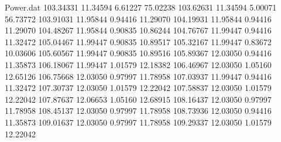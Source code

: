 \begin{filecontents}{Power.dat}
 103.34331   11.34594    6.61227   75.02238
 103.62631   11.34594    5.00071   56.73772
 103.91031   11.95844    0.94416   11.29070
 104.19931   11.95844    0.94416   11.29070
 104.48267   11.95844    0.90835   10.86244
 104.76767   11.99447    0.94416   11.32472
 105.04467   11.99447    0.90835   10.89517
 105.32167   11.99447    0.83672   10.03606
 105.60567   11.99447    0.90835   10.89516
 105.89367   12.03050    0.94416   11.35873
 106.18067   11.99447    1.01579   12.18382
 106.46967   12.03050    1.05160   12.65126
 106.75668   12.03050    0.97997   11.78958
 107.03937   11.99447    0.94416   11.32472
 107.30737   12.03050    1.01579   12.22042
 107.58837   12.03050    1.01579   12.22042
 107.87637   12.06653    1.05160   12.68915
 108.16437   12.03050    0.97997   11.78958
 108.45137   12.03050    0.97997   11.78958
 108.73936   12.03050    0.94416   11.35873
 109.01637   12.03050    0.97997   11.78958
 109.29337   12.03050    1.01579   12.22042
\end{filecontents}
